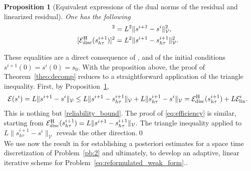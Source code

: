\documentclass[review,11pt]{article}
\numberwithin{equation}{section}
\def \t  {\tau}
\def \calE {\mathcal{E}}
\def \calV {\mathcal{V}}
\newtheorem{proposition}[proposition]{Proposition}
\begin{document}
\begin{proposition}[Equivalent expressions of the dual norms of the residual and linearized residual]\label{lemma:SP_Iterative}
One has the following 
\begin{align}
[\mathcal{E}(s^i)]^2 &=L^2 \|s^{i+1}-s^i\|_{\calV}^2, \\
[\calE_{\mathrm{disc}}^{\rm H}(s^{i+1}_{h\t})]^2 &= L^2  \|s^{i+1} - s^{i+1}_{h\t}\|_{\calV}^2.
\end{align}
\end{proposition}
These equalities are a direct consequence of , and of the initial conditions $s^{i+1}(0)=s^i(0)=s_0$.
With the proposition above, the proof of Theorem~\ref{theo:decomp} reduces to a straightforward application of the triangle inequality. First, by Proposition~\ref{lemma:SP_Iterative},
\[
\mathcal{E}(s^i)=L \|s^{i+1}-s^i\|_{\calV}\leq L \|s^{i+1} - s^{i+1}_{h\t}\|_{\calV} + L \|s^{i+1}_{h\t} - s^{i}\|_{\calV}=  \calE_{\mathrm{disc}}^{\rm H}(s^{i+1}_{h\t}) + L\calE_{\mathrm{lin}}^i.
\]
This is nothing but \eqref{reliability_bound}. The proof of \eqref{eq:efficiency} is similar, starting from $\calE_{\mathrm{disc}}^{\rm H}(s^{i+1}_{h\t})
= L\|s^{i+1}-s^{i+1}_{h\t}\|_{\calV}$. The triangle inequality applied to $L\|s^{i+1}_{h\t}-s^{i}\|_{\calV}$ reveals the other direction.\qed \\[2pt]

We use now the result in  for establishing a posteriori estimates for a space time discretization of Problem~\ref{pb:2} and ultimately, to develop an adaptive, linear iterative scheme for Problem~\ref{eq:reformulated_weak_form}..
\end{document}
